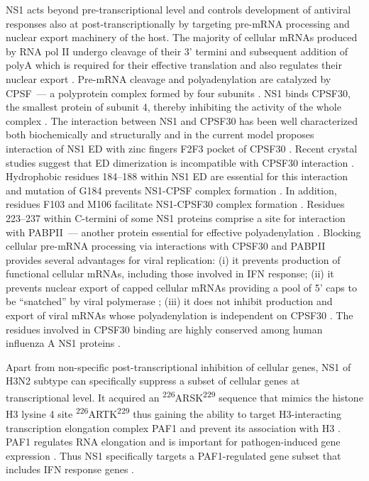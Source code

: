 		NS1 acts beyond pre-transcriptional level and controls development of antiviral responses also at post-transcriptionally by targeting pre-mRNA processing and nuclear export machinery of the host.
		The majority of cellular mRNAs produced by RNA pol II undergo cleavage of their 3' termini and subsequent addition of \gls{polyA} which is required for their effective translation and also regulates their nuclear export \parencite{Vassalli1989, Zarkower1987, Huang1996}. Pre-mRNA cleavage and polyadenylation are catalyzed by \gls{CPSF}~--- a polyprotein complex formed by four subunits \parencite{Wilusz1990, Colgan1997}. NS1 binds \gls{CPSF}30, the smallest protein of subunit 4, thereby inhibiting the activity of the whole complex \parencite{Nemeroff1998}. The interaction between NS1 and \gls{CPSF}30 has been well characterized both biochemically and structurally and in the current model proposes interaction of NS1 ED with zinc fingers F2F3 pocket of \gls{CPSF}30 \parencite{Noah2003, Twu2006, Kochs2007, Das2008}. Recent crystal studies suggest that ED dimerization is incompatible with \gls{CPSF}30 interaction \parencite{Aramini2011, Kerry2011}. Hydrophobic residues 184--188 within NS1 ED are essential for this interaction and mutation of G184 prevents NS1-CPSF complex formation \parencite{Das2008}. In addition, residues F103 and M106 facilitate NS1-CPSF30 complex formation \parencite{Kochs2007, Das2008}. Residues 223--237 within C-termini of some \gls{NS1} proteins comprise a site for interaction with \gls{PABP}II~--- another protein essential for effective polyadenylation \parencite{Li2001a}. Blocking cellular pre-mRNA processing via interactions with \gls{CPSF}30 and \gls{PABP}II provides several advantages for viral replication: (i) it prevents production of functional cellular mRNAs, including those involved in \gls{IFN} response; (ii) it prevents nuclear export of capped cellular mRNAs providing a pool of 5' caps to be ``snatched'' by viral polymerase \parencite{Nemeroff1998}; (iii) it does not inhibit production and export of viral mRNAs whose polyadenylation is independent on \gls{CPSF}30 \parencite{Plotch1977}. The residues involved in \gls{CPSF}30 binding are highly conserved among human influenza A NS1 proteins \parencite{Kochs2007, Das2008}. 
		
		Apart from non-specific post-transcriptional inhibition of cellular genes, NS1 of H3N2 subtype can specifically suppress a subset of cellular genes at transcriptional level. It acquired an \textsuperscript{226}ARSK\textsuperscript{229} sequence that mimics the histone H3 lysine 4 site \textsuperscript{226}ARTK\textsuperscript{229} thus gaining the ability to target  H3-interacting transcription elongation complex PAF1 and prevent its association with H3 \parencite{Marazzi2012}. PAF1 regulates RNA elongation and is important for pathogen-induced gene expression \parencite{Newey2009}. Thus NS1 specifically targets a PAF1-regulated gene subset that includes \gls{IFN} response genes \parencite{Marazzi2012}.
		
